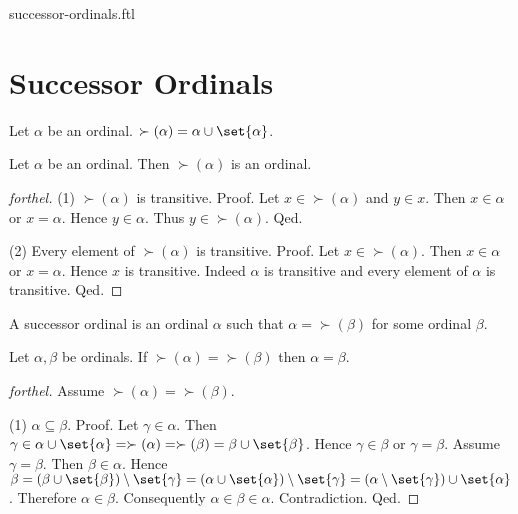 \documentclass{naproche-library}
\begin{document}
\begin{smodule}{successor-ordinals.ftl}


  \section*{Successor Ordinals}

  \begin{definition}[forthel,id=SET_THEORY_02_8166925802668032]
    Let $\alpha$ be an ordinal.
    $\succ(\alpha) = \alpha \cup \set{\alpha}$.
  \end{definition}

  \begin{proposition}[forthel,id=SET_THEORY_02_1624410224066560]
    Let $\alpha$ be an ordinal.
    Then $\succ(\alpha)$ is an ordinal.
  \end{proposition}
  \begin{proof}[forthel]
    (1) $\succ(\alpha)$ is transitive. \newline
    Proof.
      Let $x \in \succ(\alpha)$ and $y \in x$.
      Then $x \in \alpha$ or $x = \alpha$.
      Hence $y \in \alpha$.
      Thus $y \in \succ(\alpha)$.
    Qed.

    (2) Every element of $\succ(\alpha)$ is transitive. \newline
    Proof.
      Let $x \in \succ(\alpha)$.
      Then $x \in \alpha$ or $x = \alpha$.
      Hence $x$ is transitive.
      Indeed $\alpha$ is transitive and every element of $\alpha$ is transitive.
    Qed.
  \end{proof}

  \begin{definition}[forthel,id=SET_THEORY_02_7129712109289472]
    A successor ordinal is an ordinal $\alpha$ such that $\alpha = \succ(\beta)$ for some ordinal $\beta$.
  \end{definition}

  \begin{proposition}[forthel,id=SET_THEORY_02_8651096763400192]
    Let $\alpha, \beta$ be ordinals.
    If $\succ(\alpha) = \succ(\beta)$ then $\alpha = \beta$.
  \end{proposition}
  \begin{proof}[forthel]
    Assume $\succ(\alpha) = \succ(\beta)$.

    (1) $\alpha \subseteq \beta$. \newline
    Proof.
      Let $\gamma \in \alpha$.
      Then $\gamma \in \alpha \cup \set{\alpha}
        = \succ(\alpha)
        = \succ(\beta)
        = \beta \cup \set{\beta}$.
      Hence $\gamma \in \beta$ or $\gamma = \beta$.
      Assume $\gamma = \beta$.
      Then $\beta \in \alpha$.
      Hence $\beta
        = (\beta \cup \set{\beta}) \setminus \set{\gamma}
        = (\alpha \cup \set{\alpha}) \setminus \set{\gamma}
        = (\alpha \setminus \set{\gamma}) \cup \set{\alpha}$.
      Therefore $\alpha \in \beta$.
      Consequently $\alpha \in \beta \in \alpha$.
      Contradiction.
    Qed.


\end{proof}
\end{smodule}
\end{document}
